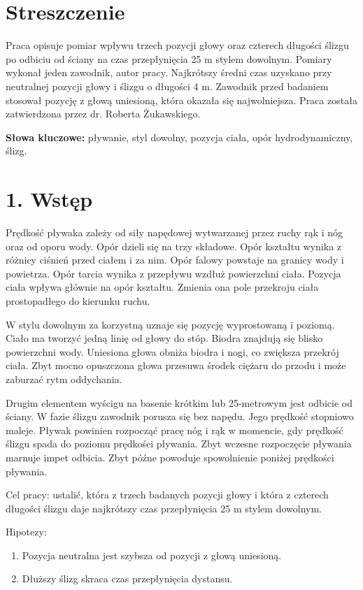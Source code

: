 \section*{Streszczenie}
Praca opisuje pomiar wpływu trzech pozycji głowy oraz czterech długości ślizgu po odbiciu od ściany na czas przepłynięcia 25 m stylem dowolnym. Pomiary wykonał jeden zawodnik, autor pracy. Najkrótszy średni czas uzyskano przy neutralnej pozycji głowy i ślizgu o długości 4 m. Zawodnik przed badaniem stosował pozycję z głową uniesioną, która okazała się najwolniejsza. Praca została zatwierdzona przez dr. Roberta Żukawskiego.

\textbf{Słowa kluczowe:} pływanie, styl dowolny, pozycja ciała, opór hydrodynamiczny, ślizg.

\section*{1. Wstęp}
Prędkość pływaka zależy od siły napędowej wytwarzanej przez ruchy rąk i nóg oraz od oporu wody. Opór dzieli się na trzy składowe. Opór kształtu wynika z różnicy ciśnień przed ciałem i za nim. Opór falowy powstaje na granicy wody i powietrza. Opór tarcia wynika z przepływu wzdłuż powierzchni ciała. Pozycja ciała wpływa głównie na opór kształtu. Zmienia ona pole przekroju ciała prostopadłego do kierunku ruchu.

W stylu dowolnym za korzystną uznaje się pozycję wyprostowaną i poziomą. Ciało ma tworzyć jedną linię od głowy do stóp. Biodra znajdują się blisko powierzchni wody. Uniesiona głowa obniża biodra i nogi, co zwiększa przekrój ciała. Zbyt mocno opuszczona głowa przesuwa środek ciężaru do przodu i może zaburzać rytm oddychania.

Drugim elementem wyścigu na basenie krótkim lub 25-metrowym jest odbicie od ściany. W fazie ślizgu zawodnik porusza się bez napędu. Jego prędkość stopniowo maleje. Pływak powinien rozpocząć pracę nóg i rąk w momencie, gdy prędkość ślizgu spada do poziomu prędkości pływania. Zbyt wczesne rozpoczęcie pływania marnuje impet odbicia. Zbyt późne powoduje spowolnienie poniżej prędkości pływania.

Cel pracy: ustalić, która z trzech badanych pozycji głowy i która z czterech długości ślizgu daje najkrótszy czas przepłynięcia 25 m stylem dowolnym.

Hipotezy:
\begin{enumerate}
\item Pozycja neutralna jest szybsza od pozycji z głową uniesioną.
\item Dłuższy ślizg skraca czas przepłynięcia dystansu.
\end{enumerate}

